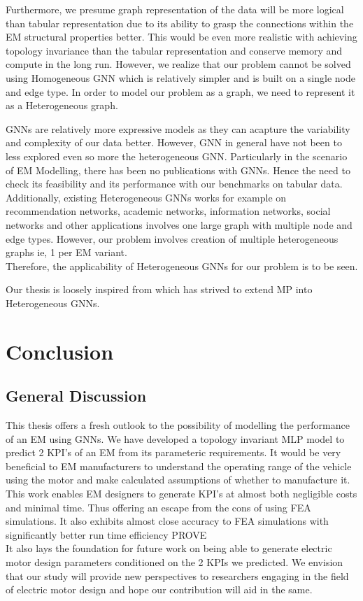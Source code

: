 \documentclass{report} %
\begin{document}
Furthermore, we presume graph representation of the data will be more logical than tabular representation due to its ability to grasp the connections within the \ac{EM} structural properties better.
This would be even more realistic with achieving topology invariance than the tabular representation and conserve memory and compute in the long run.
However, we realize that our problem cannot be solved using Homogeneous \ac{GNN} which is relatively simpler and is built on a single node and edge type.
In order to model our problem as a graph, we need to represent it as a Heterogeneous graph. 

\ac{GNN}s are relatively more expressive models as they can acapture the variability and complexity of our data better.
However, \ac{GNN} in general have not been to less explored even so more the heterogeneous \ac{GNN}.
Particularly in the scenario of \ac{EM} Modelling, there has been no publications with \ac{GNN}s.
Hence the need to check its feasibility and its performance with our benchmarks on tabular data.
Additionally, existing Heterogeneous \ac{GNN}s works for example on recommendation networks, academic networks, information networks, social networks and other applications 
involves one large graph with multiple node and edge types. 
However, our problem involves creation of multiple heterogeneous graphs ie, 1 per \ac{EM} variant.\\
Therefore, the applicability of Heterogeneous \ac{GNN}s for our problem is to be seen.

Our thesis is loosely inspired from \cite{ML HGNN-2023} which has strived to extend \ac{MP} into Heterogeneous \ac{GNN}s.\\

\chapter{Conclusion}

\section{General Discussion}\label{sec:General Discussion}
This thesis offers a fresh outlook to the possibility of modelling the performance of an \ac{EM} using \ac{GNN}s.
We have developed a topology invariant \ac{MLP} model to predict 2 \ac{KPI}'s of an \ac{EM} from its parameteric requirements. 
It would be very beneficial to \ac{EM} manufacturers to understand the operating range of the vehicle using the motor and make calculated assumptions of whether to manufacture it.\\
This work enables \ac{EM} designers to generate \ac{KPI}'s at almost both negligible costs and minimal time.
Thus offering an escape from the cons of using \ac{FEA} simulations. It also exhibits almost close accuracy to \ac{FEA} simulations with significantly better run time efficiency PROVE\\
It also lays the foundation for future work on being able to generate electric motor design parameters conditioned on the 2 KPIs we predicted.
We envision that our study will provide new perspectives to researchers engaging in the field of electric motor design and hope our contribution will aid in the same.\\
\end{document}
